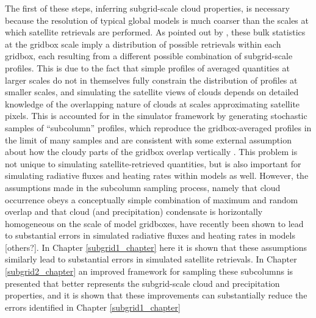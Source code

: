 The first of these steps, inferring subgrid-scale cloud properties, is necessary because the resolution of typical global models is much coarser than the scales at which satellite retrievals are performed. As pointed out by \cite{pincus_et_al_2012}, these bulk statistics at the gridbox scale imply a distribution of possible retrievals within each gridbox, each resulting from a different possible combination of subgrid-scale profiles. This is due to the fact that simple profiles of averaged quantities at larger scales do not in themselves fully constrain the distribution of profiles at smaller scales, and simulating the satellite views of clouds depends on detailed knowledge of the overlapping nature of clouds at scales approximating satellite pixels. This is accounted for in the simulator framework by generating stochastic samples of ``subcolumn'' profiles, which reproduce the gridbox-averaged profiles in the limit of many samples and are consistent with some external assumption about how the cloudy parts of the gridbox overlap vertically \citep{klein_and_jakob_1999}. This problem is not unique to simulating satellite-retrieved quantities, but is also important for simulating radiative fluxes and heating rates within models as well. However, the assumptions made in the subcolumn sampling process, namely that cloud occurrence obeys a conceptually simple combination of maximum and random overlap and that cloud (and precipitation) condensate is horizontally homogeneous on the scale of model gridboxes, have recently been shown to lead to substantial errors in simulated radiative fluxes and heating rates in models \citep{barker_et_al_1999, oreopoulos_et_al_2012} [others?]. In Chapter \ref{subgrid1_chapter} here it is shown that these assumptions similarly lead to substantial errors in simulated satellite retrievals. In Chapter \ref{subgrid2_chapter} an improved framework for sampling these subcolumns is presented that better represents the subgrid-scale cloud and precipitation properties, and it is shown that these improvements can substantially reduce the errors identified in Chapter \ref{subgrid1_chapter}


